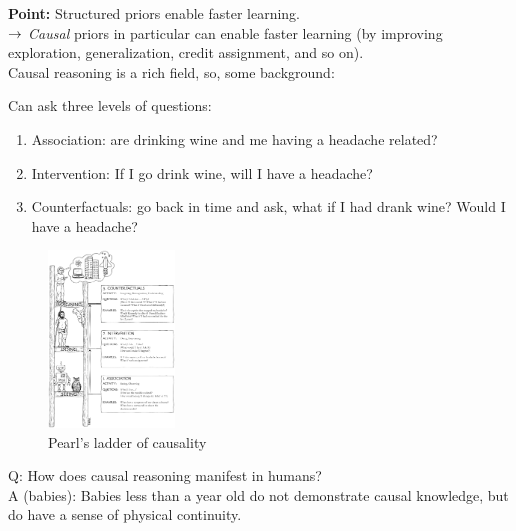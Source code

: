 {\bf Point:} Structured priors enable faster learning. \\

$\rightarrow$ {\it Causal} priors in particular can enable faster learning (by improving exploration, generalization, credit assignment, and so on). \\

Causal reasoning is a rich field, so, some background:




Can ask three levels of questions:
\begin{enumerate}
    \item Association: are drinking wine and me having a headache related?
    \item Intervention: If I go drink wine, will I have a headache?
    \item Counterfactuals: go back in time and ask, what if I had drank wine? Would I have a headache?
\end{enumerate}

\begin{figure}[h!]
    \centering
    \includegraphics[width=0.3\textwidth]{images/ladder.png}
    \caption{Pearl's ladder of causality}
    \label{fig:ladder_of_caus}
\end{figure}

Q: How does causal reasoning manifest in humans? \\

A (babies): Babies less than a year old do not demonstrate causal knowledge, but do have a sense of physical continuity. \\

